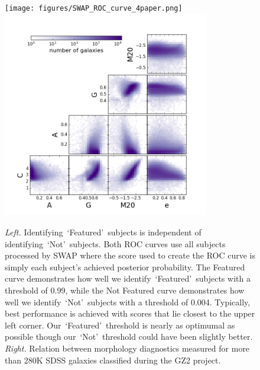\documentclass[twocolumn]{aastex6}
\newcommand{\feat}{`Featured'}
\newcommand{\notfeat}{`Not'}
\begin{document}
\begin{figure}[t!]

\texttt{[image: figures/SWAP\_ROC\_curve\_4paper.png]}
\includegraphics[width=3.55in]{figures/morph_params_entire_GZ2_sample.png}
\caption{\textit{Left.} Identifying~\feat~subjects is independent of identifying~\notfeat~subjects.  Both ROC curves use all subjects processed by SWAP where the score used to create the ROC curve is simply each subject's achieved posterior probability. The Featured curve demonstrates how well we identify~\feat~subjects with a threshold of 0.99, while the Not Featured curve demonstrates how well we identify~\notfeat~subjects with a threshold of 0.004. Typically, best performance is achieved with scores that lie closest to the upper left corner.  Our~\feat~threshold is nearly as optimumal as possible though our~\notfeat~threshold could have been slightly better. \textit{Right.} Relation between morphology diagnostics measured for more than 280K SDSS galaxies classified during the GZ2 project. \label{fig: retirement thresholds}}
\label{fig: morph thresh}
\end{figure}



\end{document}
